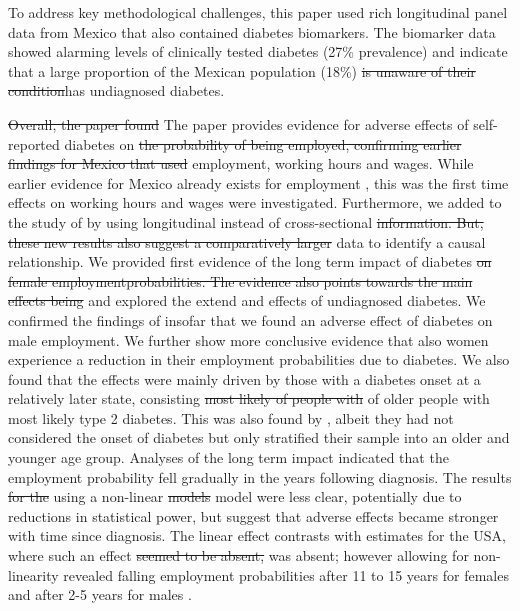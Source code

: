 \documentclass[12pt,english]{article}
\providecommand{\DIFaddtex}[1]{{\protect\color{blue}#1}} %
\providecommand{\DIFdeltex}[1]{{\protect\color{red}\sout{#1}}}                      %
\providecommand{\DIFaddbegin}{} %
\providecommand{\DIFaddend}{} %
\providecommand{\DIFdelbegin}{} %
\providecommand{\DIFdelend}{} %
\providecommand{\DIFadd}[1]{\texorpdfstring{\DIFaddtex{#1}}{#1}} %
\providecommand{\DIFdel}[1]{\texorpdfstring{\DIFdeltex{#1}}{}} %
\begin{document}
To address key methodological challenges, this paper used rich longitudinal panel data from Mexico that also contained diabetes biomarkers. The biomarker data showed alarming levels of clinically tested diabetes (27\% prevalence) and indicate that a large proportion of the Mexican population (18\%) \DIFdelbegin \DIFdel{is unaware of their condition}\DIFdelend \DIFaddbegin \DIFadd{has undiagnosed diabetes}\DIFaddend .

\DIFdelbegin \DIFdel{Overall, the paper found }\DIFdelend \DIFaddbegin \DIFadd{The paper provides }\DIFaddend evidence for adverse effects of self-reported diabetes on \DIFdelbegin \DIFdel{the probability of being employed, confirming earlier findings for Mexico that used }\DIFdelend \DIFaddbegin \DIFadd{employment, working hours and wages. While earlier evidence for Mexico already exists for employment }\parencite{Seuring2015}\DIFadd{, this was the first time effects on working hours and wages were investigated. Furthermore, we added to the study of} \textcite{Seuring2015}\DIFadd{ by using longitudinal instead of }\DIFaddend cross-sectional \DIFdelbegin \DIFdel{information. But, these new results also suggest a comparatively larger }\DIFdelend \DIFaddbegin \DIFadd{data to identify a causal relationship. We provided first evidence of the long term }\DIFaddend impact of diabetes \DIFdelbegin \DIFdel{on female employmentprobabilities. The evidence also points towards the main effects being }\DIFdelend \DIFaddbegin \DIFadd{and explored the extend and effects of undiagnosed diabetes. We confirmed the findings of} \textcite{Seuring2015}\DIFadd{ insofar that we found an adverse effect of diabetes on male employment. We further show more conclusive evidence that also women experience a reduction in their employment probabilities due to diabetes. We also found that the effects were mainly }\DIFaddend driven by those with a diabetes onset at a relatively later state, consisting \DIFdelbegin \DIFdel{most likely of people with }\DIFdelend \DIFaddbegin \DIFadd{of older people with most likely }\DIFaddend type 2 diabetes. \DIFaddbegin \DIFadd{This was also found by} \textcite{Seuring2015}\DIFadd{, albeit they had not considered the onset of diabetes but only stratified their sample into an older and younger age group. }\DIFaddend Analyses of the long term impact indicated that the employment probability fell gradually in the years following diagnosis. The results \DIFdelbegin \DIFdel{for the }\DIFdelend \DIFaddbegin \DIFadd{using a }\DIFaddend non-linear \DIFdelbegin \DIFdel{models }\DIFdelend \DIFaddbegin \DIFadd{model }\DIFaddend were less clear, potentially due to reductions in statistical power, but suggest that adverse effects became stronger with time since diagnosis. The linear effect contrasts with estimates for the USA, where such an effect \DIFdelbegin \DIFdel{seemed to be absent, }\DIFdelend \DIFaddbegin \DIFadd{was absent; }\DIFaddend however allowing for non-linearity revealed falling employment probabilities after 11 to 15 years for females and after 2-5 years for males \parencite{Minor2013}.
\end{document}
